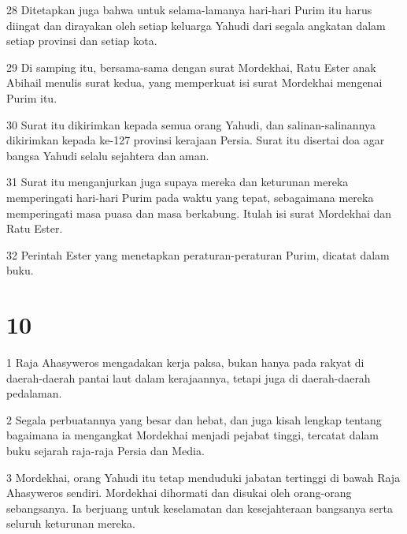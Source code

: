 \par 28 Ditetapkan juga bahwa untuk selama-lamanya hari-hari Purim itu harus diingat dan dirayakan oleh setiap keluarga Yahudi dari segala angkatan dalam setiap provinsi dan setiap kota.
\par 29 Di samping itu, bersama-sama dengan surat Mordekhai, Ratu Ester anak Abihail menulis surat kedua, yang memperkuat isi surat Mordekhai mengenai Purim itu.
\par 30 Surat itu dikirimkan kepada semua orang Yahudi, dan salinan-salinannya dikirimkan kepada ke-127 provinsi kerajaan Persia. Surat itu disertai doa agar bangsa Yahudi selalu sejahtera dan aman.
\par 31 Surat itu menganjurkan juga supaya mereka dan keturunan mereka memperingati hari-hari Purim pada waktu yang tepat, sebagaimana mereka memperingati masa puasa dan masa berkabung. Itulah isi surat Mordekhai dan Ratu Ester.
\par 32 Perintah Ester yang menetapkan peraturan-peraturan Purim, dicatat dalam buku.

\chapter{10}

\par 1 Raja Ahasyweros mengadakan kerja paksa, bukan hanya pada rakyat di daerah-daerah pantai laut dalam kerajaannya, tetapi juga di daerah-daerah pedalaman.
\par 2 Segala perbuatannya yang besar dan hebat, dan juga kisah lengkap tentang bagaimana ia mengangkat Mordekhai menjadi pejabat tinggi, tercatat dalam buku sejarah raja-raja Persia dan Media.
\par 3 Mordekhai, orang Yahudi itu tetap menduduki jabatan tertinggi di bawah Raja Ahasyweros sendiri. Mordekhai dihormati dan disukai oleh orang-orang sebangsanya. Ia berjuang untuk keselamatan dan kesejahteraan bangsanya serta seluruh keturunan mereka.


